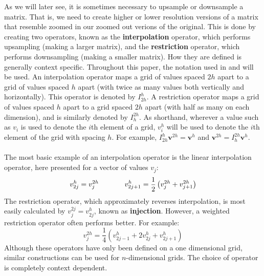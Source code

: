 As we will later see, it is sometimes necessary to upsample or downsample a matrix. That is, we need to create higher or lower resolution versions of a matrix that resemble zoomed in our zoomed out verions of the original. This is done by creating two operators, known as the \textbf{interpolation} operator, which performs upsampling (making a larger matrix), and the \textbf{restriction} operator, which performs downsampling (making a smaller matrix). How they are defined is generally context specific. Throughout this paper, the notation used in \cite{lee14} and \cite{briggs87} will be used. An interpolation operator maps a grid of values spaced $2h$ apart to a grid of values spaced $h$ apart (with twice as many values both vertically and horizontally). This operator is denoted by $I_{2h}^h$. A restriction operator maps a grid of values spaced $h$ apart to a grid spaced $2h$ apart (with half as many on each dimension), and is similarly denoted by $I_h^{2h}$. As shorthand, wherever a value such as $v_i$ is used to denote the $i$th element of a grid, $v_i^h$ will be used to denote the $i$th element of the grid with spacing $h$. For example, $I_{2h}^h\textbf{v}^{2h}=\textbf{v}^h$ and $\textbf{v}^{2h}=I_{h}^{2h}\textbf{v}^h$.
\\\\
The most basic example of an interpolation operator is the linear interpolation operator, here presented for a vector of values $v_j$:
\[v_{2j}^h=v_j^{2h}\hspace{.5in}
v_{2j+1}^h=\frac{1}{2}\left(v_j^{2h}+v_{j+1}^{2h}\right)\]
The restriction operator, which approximately reverses interpolation, is most easily calculated by $v_j^{2j}=v_{2j}^h$, known as \textbf{injection}. However, a weighted restriction operator often performs better. For example:
\[v_j^{2h}=\frac{1}{4}\left(
	v_{2j-1}^h+2v_{2j}^h+v_{2j+1}^h\right)\]
Although these operators have only been defined on a one dimensional grid, similar constructions can be used for $n$-dimensional grids. The choice of operator is completely context dependent.